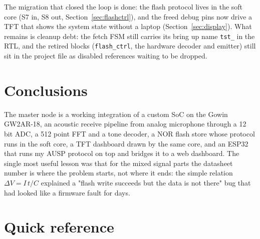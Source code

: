 \documentclass[a4paper,11pt]{article}
\begin{document}
The migration that closed the loop is done: the flash protocol lives in the soft
core (S7 in, S8 out, Section~\ref{sec:flashctrl}), and the freed debug pins now
drive a TFT that shows the system state without a laptop
(Section~\ref{sec:display}). What remains is cleanup debt: the fetch FSM still
carries its bring up name \texttt{tst\_} in the RTL, and the retired blocks
(\texttt{flash\_ctrl}, the hardware decoder and emitter) still sit in the
project file as disabled references waiting to be dropped.

\section{Conclusions}

The master node is a working integration of a custom SoC on the Gowin GW2AR-18, an
acoustic receive pipeline from analog microphone through a 12 bit ADC, a 512 point
FFT and a tone decoder, a NOR flash store whose protocol runs in the soft core, a
TFT dashboard drawn by the same core, and an ESP32 that runs my
AUSP protocol on top and bridges it to a web dashboard. The single most useful
lesson was that for the mixed signal parts the datasheet number is where the problem
starts, not where it ends: the simple relation $\Delta V = I\,t/C$ explained a
"flash write succeeds but the data is not there" bug that had looked like a firmware
fault for days.

\appendix
\section{Quick reference}
\end{document}
